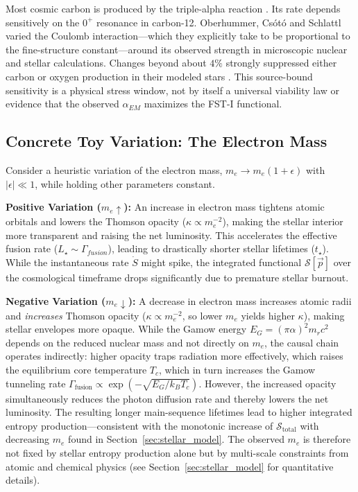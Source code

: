 \documentclass[12pt,a4paper]{article}
\theoremstyle{remark}
\begin{document}
Most cosmic carbon is produced by the triple-alpha reaction \citep{Adams2019,Oberhummer2000}. Its rate depends sensitively on the $0^+$ resonance in carbon-12. Oberhummer, Cs\'ot\'o and Schlattl varied the Coulomb interaction---which they explicitly take to be proportional to the fine-structure constant---around its observed strength in microscopic nuclear and stellar calculations. Changes beyond about $4\%$ strongly suppressed either carbon or oxygen production in their modeled stars \citep{Oberhummer2000}. This source-bound sensitivity is a physical stress window, not by itself a universal viability law or evidence that the observed $\alpha_{EM}$ maximizes the FST-I functional.

\subsection{Concrete Toy Variation: The Electron Mass}

Consider a heuristic variation of the electron mass, $m_e \to m_e(1+\epsilon)$ with $|\epsilon| \ll 1$, while holding other parameters constant.

\textbf{Positive Variation ($m_e \uparrow$):} An increase in electron mass tightens atomic orbitals and lowers the Thomson opacity ($\kappa \propto m_e^{-2}$), making the stellar interior more transparent and raising the net luminosity. This accelerates the effective fusion rate ($L_\star \sim \Gamma_{fusion}$), leading to drastically shorter stellar lifetimes ($t_\star$). While the instantaneous rate $\dot{S}$ might spike, the integrated functional $\mathcal{S}[\vec{p}]$ over the cosmological timeframe drops significantly due to premature stellar burnout.

\textbf{Negative Variation ($m_e \downarrow$):} A decrease in electron mass increases atomic radii and \emph{increases} Thomson opacity ($\kappa \propto m_e^{-2}$, so lower $m_e$ yields higher $\kappa$), making stellar envelopes more opaque. While the Gamow energy $E_G = (\pi \alpha)^2 m_r c^2$ depends on the reduced nuclear mass and not directly on $m_e$, the causal chain operates indirectly: higher opacity traps radiation more effectively, which raises the equilibrium core temperature $T_c$, which in turn increases the Gamow tunneling rate $\Gamma_{\text{fusion}} \propto \exp(-\sqrt{E_G / k_B T_c})$. However, the increased opacity simultaneously reduces the photon diffusion rate and thereby lowers the net luminosity. The resulting longer main-sequence lifetimes lead to higher integrated entropy production---consistent with the monotonic increase of $\mathcal{S}_{\text{total}}$ with decreasing $m_e$ found in Section~\ref{sec:stellar_model}. The observed $m_e$ is therefore not fixed by stellar entropy production alone but by multi-scale constraints from atomic and chemical physics (see Section~\ref{sec:stellar_model} for quantitative details).
\end{document}
